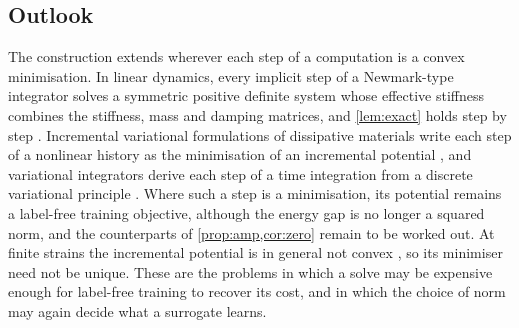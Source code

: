 \subsection{Outlook}\label{sec:discussion:outlook}
The construction extends wherever each step of a computation is a convex minimisation. In
linear dynamics, every implicit step of a Newmark-type integrator solves a symmetric
positive definite system whose effective stiffness combines the stiffness, mass and damping
matrices, and \cref{lem:exact} holds step by step \cite{CaoSong2026}. Incremental
variational formulations of dissipative materials write each step of a nonlinear history as
the minimisation of an incremental potential \cite{OrtizStainier1999}, and variational
integrators derive each step of a time integration from a discrete variational principle
\cite{MarsdenWest2001}. Where such a step is a minimisation, its potential remains a
label-free training objective, although the energy gap is no longer a squared norm, and the
counterparts of \cref{prop:amp,cor:zero} remain to be worked out. At finite strains the incremental potential is in general not convex \cite{OrtizStainier1999}, so its
minimiser need not be unique. These are the problems in which a solve may be expensive
enough for label-free training to recover its cost, and in which the choice of norm may again
decide what a surrogate learns.
